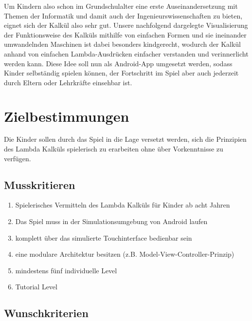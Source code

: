 \documentclass{scrartcl}
\begin{document}
Um Kindern also schon im Grundschulalter eine erste Auseinandersetzung
mit Themen der Informatik und damit auch der Ingenieurswissenschaften
zu bieten, eignet sich der Kalkül also sehr gut. Unsere nachfolgend
dargelegte Visualisierung der Funktionsweise des Kalküls mithilfe
von einfachen Formen und sie ineinander umwandelnden Maschinen ist
dabei besonders kindgerecht, wodurch der Kalkül anhand von einfachen
Lambda-Ausdrücken einfacher verstanden und verinnerlicht werden kann.
Diese Idee soll nun als Android-App umgesetzt werden, sodass Kinder
selbständig spielen können, der Fortschritt im Spiel aber auch jederzeit
durch Eltern oder Lehrkräfte einsehbar ist. 

\clearpage

\section{Zielbestimmungen}


Die Kinder sollen durch das Spiel in die Lage versetzt werden, sich die Prinzipien des Lambda Kalküls spielerisch zu erarbeiten ohne über Vorkenntnisse zu verfügen.

\subsection{Musskritieren}

\begin{enumerate}
	\item Spielerisches Vermitteln des Lambda Kalküls für Kinder ab acht Jahren
	\item Das Spiel muss in der Simulationsumgebung von Android laufen
	\item komplett über das simulierte Touchinterface bedienbar sein
	\item eine modulare Architektur besitzen (z.B. Model-View-Controller-Prinzip)
	\item mindestens fünf individuelle Level
	\item Tutorial Level
\end{enumerate}

\subsection{Wunschkriterien}
\end{document}
